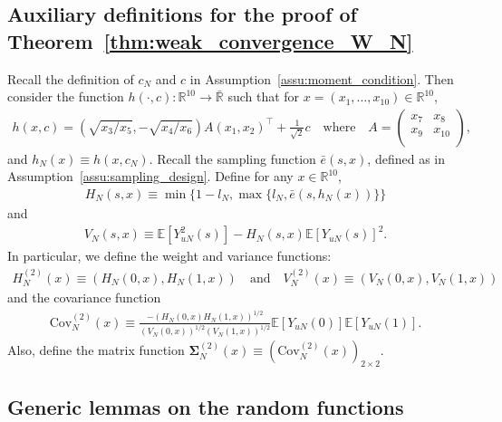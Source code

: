 \documentclass[12pt]{article}
\newcommand{\E}{\mathbb E}								%
\begin{document}
\subsection{Auxiliary definitions for the proof of Theorem~\ref{thm:weak_convergence_W_N}}\label{sec:notation_main_proof}

Recall the definition of $c_N$ and $c$ in Assumption~\ref{assu:moment_condition}. Then consider the function $h(\cdot,c):\mathbb{R}^{10}\rightarrow\bar{\mathbb{R}}$ such that for $x=(x_1,\ldots,x_{10})\in\mathbb{R}^{10}$,
\begin{align}\label{eq:def_h_c_function}
	h(x,c)= (\sqrt{x_3/x_5},-\sqrt{x_4/x_6})  A (x_1, x_2)^\top+\frac{1}{\sqrt{2}}c\quad\text{where}\quad A=
	\begin{pmatrix}
		x_7 & x_8 \\
		x_9 & x_{10}\\
	\end{pmatrix},
\end{align} 
and $h_N(x)\equiv h(x,c_N)$. Recall the sampling function $\bar e(s,x)$, defined as in Assumption~\ref{assu:sampling_design}. Define for any $x\in\mathbb{R}^{10}$, 
\begin{align*}
	H_N(s,x)\equiv \min\{1-l_N, \max\{l_N, \bar e(s,h_N(x))\}\}
\end{align*}
and 
\begin{align*}
	V_N(s,x)\equiv \E[Y_{uN}^2(s)]-H_N(s,x)\E[Y_{uN}(s)]^2.
\end{align*}
In particular, we define the weight and variance functions: 
\begin{align*}
	H_N^{(2)}(x)\equiv (H_N(0,x),H_N(1,x))\quad\text{and}\quad V_N^{(2)}(x)\equiv (V_N(0,x),V_N(1,x))
\end{align*}
and the covariance function 
\begin{align}\label{eq:cov_N_x_def}
	\mathrm{Cov}_N^{(2)}(x)\equiv \frac{-(H_N(0,x)H_N(1,x))^{1/2}}{(V_{N}(0,x))^{1/2}(V_{N}(1,x))^{1/2}}\E[Y_{uN}(0)]\E[Y_{uN}(1)].
\end{align}
Also, define the matrix function $\bm \Sigma_N^{(2)}(x)\equiv (\mathrm{Cov}_N^{(2)}(x))_{2\times 2}$.

\subsection{Generic lemmas on the random functions}
\end{document}
